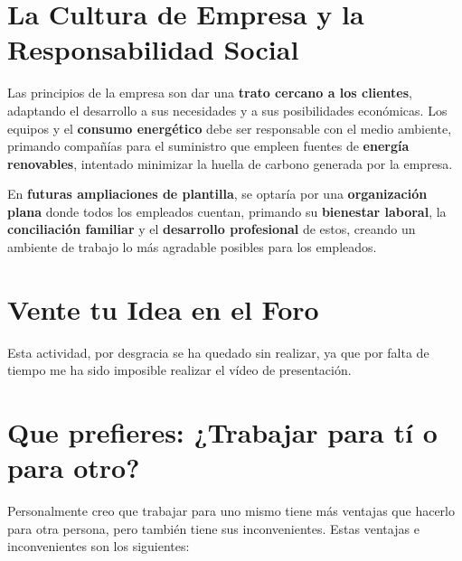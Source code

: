 \section{La Cultura de Empresa y la Responsabilidad Social}
Las principios de la empresa son dar una \textbf{trato cercano a los clientes}, adaptando el desarrollo a sus necesidades y a sus posibilidades económicas. Los equipos y el \textbf{consumo energético} debe ser responsable con el medio ambiente, primando compañías para el suministro que empleen fuentes de \textbf{energía renovables}, intentado minimizar la huella de carbono generada por la empresa.

En \textbf{futuras ampliaciones de plantilla}, se optaría por una \textbf{organización plana} donde todos los empleados cuentan, primando su \textbf{bienestar laboral}, la \textbf{conciliación familiar} y el \textbf{desarrollo profesional} de estos, creando un ambiente de trabajo lo más agradable posibles para los empleados.

\section{Vente tu Idea en el Foro}

Esta actividad, por desgracia se ha quedado sin realizar, ya que por falta de tiempo me ha sido imposible realizar el vídeo de presentación.

\section{Que prefieres: ¿Trabajar para tí o para otro?}
Personalmente creo que trabajar para uno mismo tiene más ventajas que hacerlo para otra persona, pero también tiene sus inconvenientes. Estas ventajas e inconvenientes son los siguientes:

